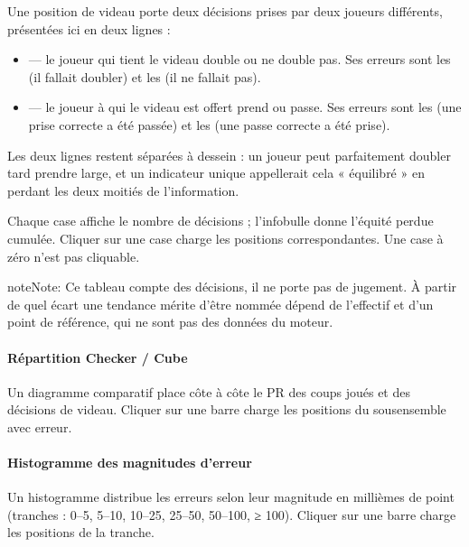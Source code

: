 \documentclass[letterpaper,10pt,french]{sphinxmanual}
\begin{document}
\sphinxAtStartPar
Une position de videau porte deux décisions prises par deux joueurs
différents, présentées ici en deux lignes :
\begin{itemize}
\item {} 
\sphinxAtStartPar
{} — le joueur qui tient le videau double ou ne double pas. Ses
erreurs sont les  (il fallait doubler) et les  (il ne fallait pas).

\item {} 
\sphinxAtStartPar
{} — le joueur à qui le videau est offert prend ou passe. Ses
erreurs sont les  (une prise correcte a été passée) et les
 (une passe correcte a été prise).

\end{itemize}

\sphinxAtStartPar
Les deux lignes restent séparées à dessein : un joueur peut parfaitement
doubler tard  prendre large, et un indicateur unique appellerait cela
« équilibré » en perdant les deux moitiés de l’information.

\sphinxAtStartPar
Chaque case affiche le nombre de décisions ; l’infobulle donne l’équité perdue
cumulée. Cliquer sur une case charge les positions correspondantes. Une case à
zéro n’est pas cliquable.

\begin{sphinxadmonition}{note}{Note:}
\sphinxAtStartPar
Ce tableau compte des décisions, il ne porte pas de jugement. À partir de
quel écart une tendance mérite d’être nommée dépend de l’effectif et d’un
point de référence, qui ne sont pas des données du moteur.
\end{sphinxadmonition}


\paragraph{Répartition Checker / Cube}
\label{\detokenize{manuel:repartition-checker-cube}}
\sphinxAtStartPar
Un diagramme comparatif place côte à côte le PR des coups joués et des
décisions de videau. Cliquer sur une barre charge les positions du
sous\sphinxhyphen{}ensemble avec erreur.


\paragraph{Histogramme des magnitudes d’erreur}
\label{\detokenize{manuel:histogramme-des-magnitudes-d-erreur}}
\sphinxAtStartPar
Un histogramme distribue les erreurs selon leur magnitude en millièmes de
point (tranches : 0–5, 5–10, 10–25, 25–50, 50–100, ≥ 100). Cliquer sur
une barre charge les positions de la tranche.
\end{document}
